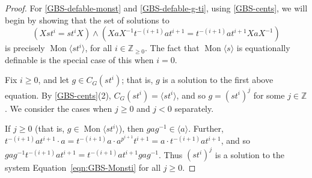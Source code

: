 \documentclass[11pt]{amsart}
\theoremstyle{definition}
\numberwithin{theorem}{section}
\DeclareMathOperator{\Mon}{Mon}
\newcommand{\Z}{\mathbb{Z}}
\begin{document}
	\begin{proof}
			For \eqref{GBS-defable-monst} and \eqref{GBS-defable-g-ti}, using \cref{GBS-cents}, we will begin by showing
			that the set of solutions to
			\begin{equation}
					\label{eqn:GBS-Monsti}
					(X st^i = st^i X) \wedge (XaX^{-1} t^{-(i + 1)} at^{i + 1} = t^{-(i + 1)}
			at^{i + 1} XaX^{-1})
			\end{equation}
			is precisely \(\Mon\langle st^i \rangle\), for all \(i \in \Z_{\geq
			0}\). The fact that \(\Mon \langle s \rangle\) is equationally
			definable is the special case of this when \(i = 0\).

			Fix \(i \geq 0\), and let \(g \in 
			 C_G(st^i)\); that is, \(g\) is a solution to the first above equation.
			 By \cref{GBS-cents}(2), \(C_G(st^i) = \langle st^i \rangle\), and so
			 \(g = (st^i)^j\) for some \(j \in \Z\). We consider the cases when
			 \(j \geq 0\) and \(j < 0\) separately.

			 If \(j \geq 0\) (that is, \(g \in \Mon\langle st^i \rangle\)),
			 then \(gag^{-1} \in \langle a \rangle\). Further, \(t^{-(i + 1)} a
			 t^{i + 1} \cdot a = t^{-(i + 1)} a \cdot a^{p^{i + 1}} t^{i + 1} =
			 a \cdot t^{-(i + 1)} at^{i + 1}\), and so \(gag^{-1} t^{-(i + 1)}
			 a t^{i + 1} = t^{-(i + 1)} a t^{i + 1} gag^{-1}\). Thus
			 \((st^i)^j\) is a solution to the system Equation~\eqref{eqn:GBS-Monsti}
			 for all \(j \geq 0\).


\end{proof}
\end{document}

